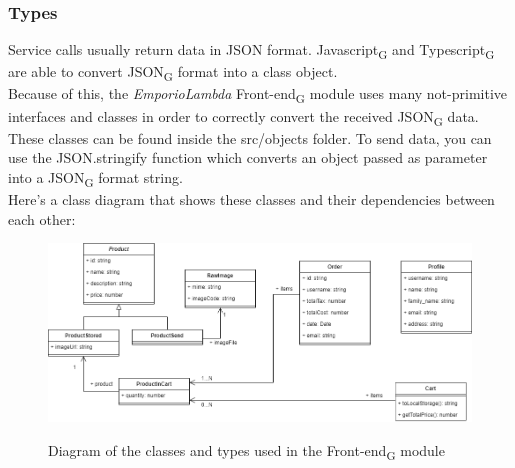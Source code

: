 \subsubsection{Types}
Service calls usually return data in JSON format. Javascript\textsubscript{G} and Typescript\textsubscript{G} are able to convert JSON\textsubscript{G} format into a class object.\\
Because of this, the \textit{EmporioLambda} Front-end\textsubscript{G} module uses many not-primitive interfaces and classes in order to correctly convert the received JSON\textsubscript{G} data. These classes can be found inside the src/objects folder. To send data, you can use the JSON.stringify function which converts an object passed as parameter into a JSON\textsubscript{G} format string.\\Here's a class diagram that shows these classes and their dependencies between each other:
\vspace{0.5cm}
\begin{figure}[H]
\centering
\includegraphics[scale=0.45]{res/Architettura/Frontend/img/class_frontend_types}\\
\caption{Diagram of the classes and types used in the Front-end\textsubscript{G} module}
\end{figure}